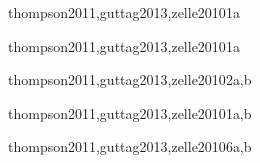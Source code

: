 \begin{syllabus}
\begin{unit}{\PLOverviewDef}{thompson2011,guttag2013,zelle2010}{1}{a}
   \begin{unitgoals}
      \item \PLOverviewObjONE
      \item \PLOverviewObjTWO
   \end{unitgoals}
\end{unit}

\begin{unit}{\PLDeclarationsAndTypesDef}{thompson2011,guttag2013,zelle2010}{1}{a}
    \begin{topics}%
	\item \PLDeclarationsAndTypesTopicThe%
	\item \PLDeclarationsAndTypesTopicOverview%
    \end{topics}%
    \PLDeclarationsAndTypesAllObjectives
\end{unit}

\begin{unit}{\PFFundamentalConstructsDef}{thompson2011,guttag2013,zelle2010}{2}{a,b}
  \PFFundamentalConstructsAllTopics
  \PFFundamentalConstructsAllObjectives
\end{unit}

\begin{unit}{\PLFunctionalProgrammingDef}{thompson2011,guttag2013,zelle2010}{1}{a,b}
    \begin{topics}%
	\item \PLFunctionalProgrammingTopicOverview%
	\item \PLFunctionalProgrammingTopicRecursion%
	\item \PLFunctionalProgrammingTopicPragmatics%
    \end{topics}%
   \PLFunctionalProgrammingAllObjectives
\end{unit}

\begin{unit}{\PFRecursionDef}{thompson2011,guttag2013,zelle2010}{6}{a,b}
    \begin{topics}%
	\item \PFRecursionTopicTheconcept%
	\item \PFRecursionTopicRecursive%
	\item \PFRecursionTopicSimple%
	\item \PFRecursionTopicDiveAndConquer%
    \end{topics}%

    \begin{unitgoals}%
	\item \PFRecursionObjONE%
	\item \PFRecursionObjTWO%
	\item \PFRecursionObjTHREE%
	\item \PFRecursionObjFOUR%
	\item \PFRecursionObjFIVE%
	\item \PFRecursionObjSIX%
	\item \PFRecursionObjEIGHT%
    \end{unitgoals}%
\end{unit}


\end{syllabus}
